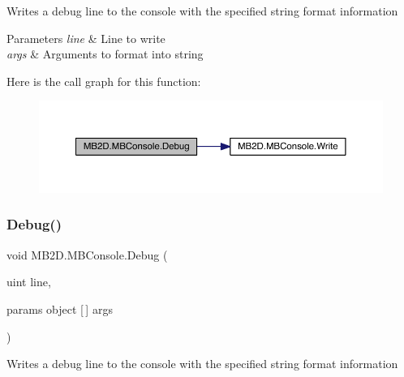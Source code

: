 Writes a debug line to the console with the specified string format information 


\begin{DoxyParams}{Parameters}
{\em line} & Line to write\\
\hline
{\em args} & Arguments to format into string\\
\hline
\end{DoxyParams}
Here is the call graph for this function\+:\nopagebreak
\begin{figure}[H]
\begin{center}
\leavevmode
\includegraphics[width=350pt]{class_m_b2_d_1_1_m_b_console_a1235820bedb1bc0598c863a0d7033329_cgraph}
\end{center}
\end{figure}
\hypertarget{class_m_b2_d_1_1_m_b_console_aef53935b8ae3c6cd2b87a81e5dbcdf1e}{}\label{class_m_b2_d_1_1_m_b_console_aef53935b8ae3c6cd2b87a81e5dbcdf1e} 
\subsubsection{\texorpdfstring{Debug()}{Debug()}\hspace{0.1cm}{\footnotesize\ttfamily [3/4]}}
{\footnotesize\ttfamily void M\+B2\+D.\+M\+B\+Console.\+Debug (\begin{DoxyParamCaption}\item[{uint}]{line,  }\item[{params object \mbox{[}$\,$\mbox{]}}]{args }\end{DoxyParamCaption})\hspace{0.3cm}{\ttfamily [inline]}}



Writes a debug line to the console with the specified string format information 


